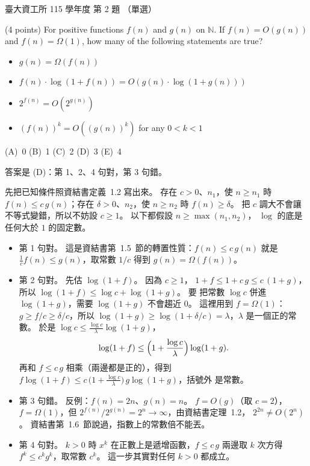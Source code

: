 \begin{pastexam}[label={px:ntu-115-dsa-02}]{臺大資工所 115 學年度 第 2 題}
（單選）

(4 points) For positive functions $f(n)$ and $g(n)$ on $\mathbb{N}$. If $f(n)=O(g(n))$ and $f(n)=\Omega(1)$, how many of the following statements are true?
\begin{itemize}
\item $g(n)=\Omega(f(n))$
\item $f(n)\cdot\log(1+f(n))=O(g(n)\cdot\log(1+g(n)))$
\item $2^{f(n)}=O(2^{g(n)})$
\item $(f(n))^k=O((g(n))^k)$ for any $0<k<1$
\end{itemize}


(A)~0 \qquad (B)~1 \qquad (C)~2 \qquad (D)~3 \qquad (E)~4
\end{pastexam}

\begin{pastsoln}
答案是 (D)：第 1、2、4 句對，第 3 句錯。

先把已知條件照資結書定義~1.2 寫出來。 存在 $c > 0$、$n_1$，使 $n \ge n_1$ 時
$f(n) \le c\,g(n)$；存在 $\delta > 0$、$n_2$，使 $n \ge n_2$ 時 $f(n) \ge \delta$。 把
$c$ 調大不會讓不等式變錯，所以不妨設 $c \ge 1$。 以下都假設 $n \ge \max(n_1, n_2)$，
$\log$ 的底是任何大於 $1$ 的固定數。

\begin{itemize}
\item 第 1 句對。 這是資結書第~1.5~節的轉置性質：$f(n) \le c\,g(n)$ 就是
$\frac{1}{c} f(n) \le g(n)$，取常數 $1/c$ 得到 $g(n) = \Omega(f(n))$。
\item 第 2 句對。 先估 $\log(1 + f)$。 因為 $c \ge 1$，
$1 + f \le 1 + c\,g \le c\,(1 + g)$，所以 $\log(1 + f) \le \log c + \log(1 + g)$。 要
把常數 $\log c$ 併進 $\log(1 + g)$，需要 $\log(1 + g)$ 不會趨近 $0$。 這裡用到
$f = \Omega(1)$：$g \ge f / c \ge \delta / c$，所以
$\log(1 + g) \ge \log(1 + \delta / c) = \lambda$，$\lambda$ 是一個正的常數。 於是
$\log c \le \frac{\log c}{\lambda} \log(1 + g)$，
\[
\log(1 + f) \le \Bigl(1 + \frac{\log c}{\lambda}\Bigr) \log(1 + g).
\]
再和 $f \le c\,g$ 相乘（兩邊都是正的），得到
$f \log(1 + f) \le c\,\bigl(1 + \frac{\log c}{\lambda}\bigr)\, g \log(1 + g)$，括號外
是常數。
\item 第 3 句錯。 反例：$f(n) = 2n$、$g(n) = n$。 $f = O(g)$（取 $c = 2$），
$f = \Omega(1)$，但 $2^{f(n)} / 2^{g(n)} = 2^{n} \to \infty$，由資結書定理~1.2，
$2^{2n} \ne O(2^n)$。 資結書第~1.6~節說過，指數上的常數倍不能丟。
\item 第 4 句對。 $k > 0$ 時 $x^k$ 在正數上是遞增函數，$f \le c\,g$ 兩邊取 $k$ 次方得
$f^k \le c^k g^k$，取常數 $c^k$。 這一步其實對任何 $k > 0$ 都成立。
\end{itemize}
\end{pastsoln}

